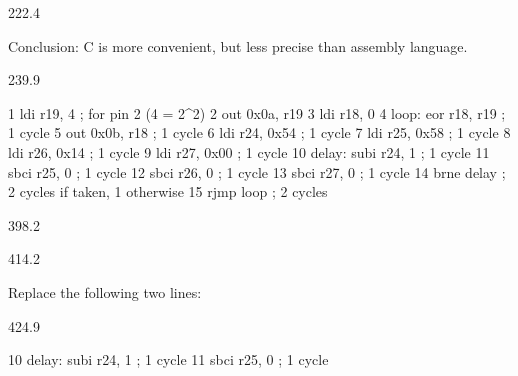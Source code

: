 \documentclass{aslab}
\makeatletter
\newcommand*\aN[1]{\textcolor{codeorange}{#1}}%
\newcommand*\aI[1]{\textcolor{codegreen}{#1}}%
\newcommand*\aK[1]{\textcolor{codered}{#1}}%
\newcommand*\aR[1]{\textcolor{codecyan}{#1}}%
\newcommand*\aC[1]{\textcolor{codepurple}{#1}}%
\newenvironment{asmlisting}[1][11]{\par
  \edef\asm@bs{\the\baselineskip}\fontsize{#1bp}{\asm@bs}\selectfont
  \ttfamily\asm@setup}{\par}
\makeatother
\begin{document}
\begin{region}[x=68.7,right=0]{222.4}
\begin{dashlist}
\item Conclusion: C is more convenient, but less precise than assembly
  language.
\end{dashlist}
\end{region}

\begin{region}[pitch=10]{239.9}
\begin{asmlisting}[9]
  \aN{1}         \aI{ldi}     \aR{r19},    \aK{4}           \aC{; for pin 2 (4 = 2\textasciicircum{}2)}
  \aN{2}         \aI{out}     \aK{0x0a},   \aR{r19}
  \aN{3}         \aI{ldi}     \aR{r18},    \aK{0}
  \aN{4 loop}:   \aI{eor}     \aR{r18}\aN{,}    \aR{r19}         \aC{; 1 cycle}
  \aN{5}         \aI{out}     \aK{0x0b},   \aR{r18}         \aC{; 1 cycle}
  \aN{6}         \aI{ldi}     \aR{r24},    \aK{0x54}        \aC{; 1 cycle}
  \aN{7}         \aI{ldi}     \aR{r25},    \aK{0x58}        \aC{; 1 cycle}
  \aN{8}         \aI{ldi}     \aR{r26},    \aK{0x14}        \aC{; 1 cycle}
  \aN{9}         \aI{ldi}     \aR{r27},    \aK{0x00}        \aC{; 1 cycle}
 \aN{10 delay}:  \aI{subi}    \aR{r24},    \aK{1}           \aC{; 1 cycle}
 \aN{11}         \aI{sbci}    \aR{r25},    \aK{0}           \aC{; 1 cycle}
 \aN{12}         \aI{sbci}    \aR{r26},    \aK{0}           \aC{; 1 cycle}
 \aN{13}         \aI{sbci}    \aR{r27},    \aK{0}           \aC{; 1 cycle}
 \aN{14}         \aI{brne}    \aR{delay}               \aC{; 2 cycles if taken, 1 otherwise}
 \aN{15}         \aI{rjmp}    \aR{loop}                \aC{; 2 cycles}
\end{asmlisting}
\end{region}

\begin{region}{398.2}
\end{region}

\begin{region}{414.2}
\begin{numlist}
\item Replace the following two lines:
\end{numlist}
\end{region}

\begin{region}[x=74.7,right=0,pitch=10]{424.9}
\begin{asmlisting}[9]
\aN{10 delay}\aC{:}  \aI{subi}    \aR{r24},    \aK{1}           \aC{; 1 cycle}
\aN{11}         \aI{sbci}    \aR{r25},    \aK{0}           \aC{; 1 cycle}
\end{asmlisting}
\end{region}
\end{document}
